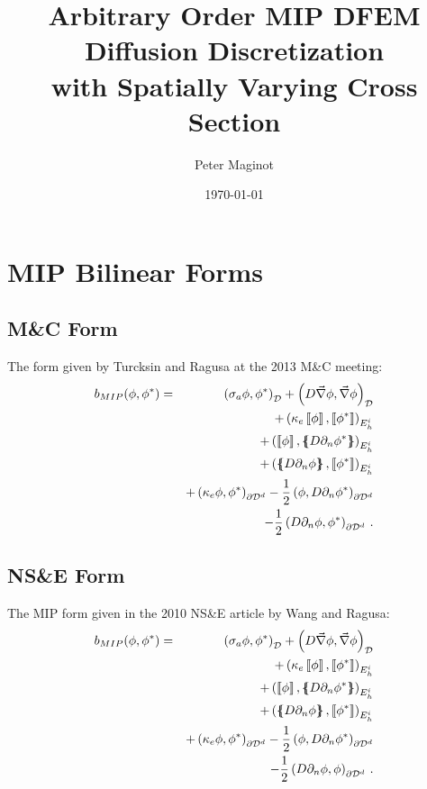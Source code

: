 \documentclass[11pt]{article}
\newcommand{\bea}{\begin{eqnarray*}}
\newcommand{\eea}{\end{eqnarray*}}
\newcommand{\del}{\ensuremath{ \vec{\nabla} }}
\newcommand{\jmp}[1]{\ensuremath{\left\llbracket #1 \right\rrbracket}}
\newcommand{\avg}[1]{\ensuremath{ \left \{ \hspace{-0.055in} \left \{ #1  \right \}\hspace{-0.055in} \right \} }}
\newcommand{\pep}{\, .}
\begin{document}
\author{Peter Maginot}
\date{\today}
\title{Arbitrary Order MIP DFEM Diffusion Discretization \\
with Spatially Varying Cross Section}
\maketitle
\section{MIP Bilinear Forms}

\subsection{M\&C Form}
The form given by Turcksin and Ragusa at the 2013 M\&C meeting:
\bea
b_{MIP}(\phi,\phi^*) = &&\left( \sigma_a\phi,\phi^* \right)_{\cal D} + \left( D\del\phi,\del\phi \right)_{\cal D} \\
&& +\left( \kappa_e \jmp{\phi},\jmp{\phi^*}\right)_{E_h^i} \\
&& +\left(  \jmp{\phi}, \avg{ D\partial_n \phi^*}\right)_{E_h^i} \\
&& +\left( \avg{D\partial_n\phi}, \jmp{\phi^*} \right)_{E_h^i} \\
&& +\left( \kappa_e \phi, \phi^*\right)_{\partial {\cal D}^d} - \frac{1}{2}\left( \phi, D\partial_n \phi^* \right)_{\partial {\cal D}^d} \\
&& -\frac{1}{2}\left( D \partial_n \phi , \phi^* \right)_{\partial {\cal D}^d}
\pep
\eea

\subsection{NS\&E Form}
The MIP form given in the 2010 NS\&E article by Wang and Ragusa:
\bea
b_{MIP}(\phi,\phi^*) = &&\left( \sigma_a\phi,\phi^* \right)_{\cal D} + \left( D\del\phi,\del\phi \right)_{\cal D} \\
&& +\left( \kappa_e \jmp{\phi},\jmp{\phi^*}\right)_{E_h^i} \\
&& +\left(  \jmp{\phi}, \avg{ D\partial_n \phi^*}\right)_{E_h^i} \\
&& +\left( \avg{D\partial_n\phi}, \jmp{\phi^*} \right)_{E_h^i} \\
&& +\left( \kappa_e \phi, \phi^*\right)_{\partial {\cal D}^d} - \frac{1}{2}\left( \phi, D\partial_n \phi^* \right)_{\partial {\cal D}^d} \\
&& -\frac{1}{2}\left( D \partial_n \phi , \phi \right)_{\partial {\cal D}^d}
\pep
\eea
\end{document}
